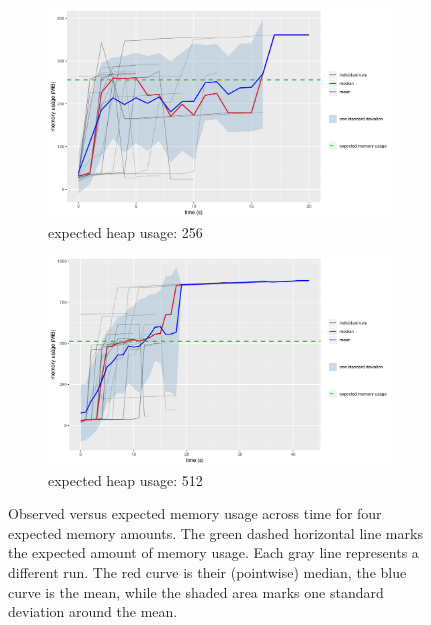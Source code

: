 \documentclass{article}
\begin{document}
\begin{figure}
\begin{subfigure}[t]{0.49\textwidth}
    \label{fig:heap_128}
  \end{subfigure}
  \begin{subfigure}[t]{0.49\textwidth}
    \centering
    \includegraphics[width=\textwidth]{../plots/heap_256.png}
    \caption{expected heap usage: \SI{256}{\mebi\byte}}
    \label{fig:heap_256}
  \end{subfigure}
  \begin{subfigure}[t]{0.49\textwidth}
    \centering
    \includegraphics[width=\textwidth]{../plots/heap_512.png}
    \caption{expected heap usage: \SI{512}{\mebi\byte}}
    \label{fig:heap_512}
  \end{subfigure}
  \caption{Observed versus expected memory usage across time for four expected
    memory amounts. The green dashed horizontal line marks the expected amount
    of memory usage. Each gray line represents a different run. The red curve is
    their (pointwise) median, the blue curve is the mean, while the shaded area
    marks one standard deviation around the mean.}
  \label{fig:heap_experiment}
\end{figure}
\end{document}
